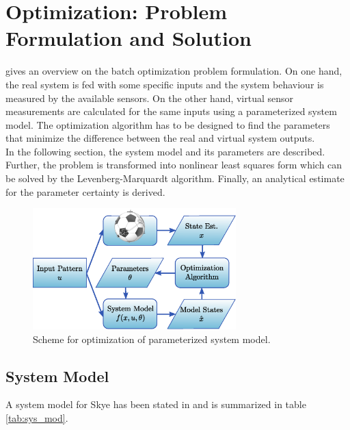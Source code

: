 \chapter{Optimization: Problem Formulation and Solution}
\label{chap:batch}

 gives an overview on the batch optimization problem formulation.
On one hand, the real system is fed with some specific inputs and the system behaviour is measured by the available sensors.
On the other hand, virtual sensor measurements are calculated for the same inputs using a parameterized system model.
The optimization algorithm has to be designed to find the parameters that minimize the difference between the real and virtual system outputs.
\\


In the following section, the system model and its parameters are described.
Further, the problem is transformed into nonlinear least squares form which can be solved by the Levenberg-Marquardt algorithm. Finally, an analytical estimate for the parameter certainty is derived.

\begin{figure}[btp]
\centering
\includegraphics[width=0.7\textwidth]{images/problem_formulation.eps}
\caption{Scheme for optimization of parameterized system model.}
\label{fig:batch_opti}
\end{figure}

\section{System Model}
\label{sec:system_model}
A system model for Skye has been stated in \citep{Weichart2012} and is summarized in table \ref{tab:sys_mod}.

